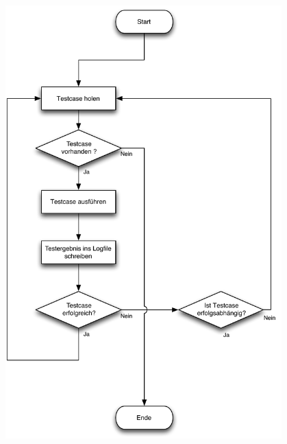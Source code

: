 \begin{center}
\includegraphics[width=0.8\textwidth,angle=0]{./grafiken/pzd_djangoprojekt.pdf}
\end{center}

\clearpage
